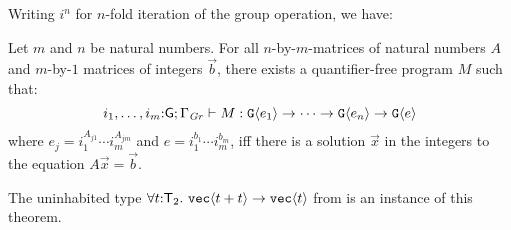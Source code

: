 Writing $i^n$ for $n$-fold iteration of the group operation, we have:
\begin{theorem}
  Let $m$ and $n$ be natural numbers. For all $n$-by-$m$-matrices of
  natural numbers $A$ and $m$-by-$1$ matrices of integers $\vec{b}$,
  there exists a quantifier-free program $M$ such that:
  \begin{displaymath}
    i_1,\dots,i_m\mathord:\mathsf{G}; \Gamma_{\mathit{Gr}} \vdash M : \textup{\texttt{G}}\langle e_1 \rangle \to \dots \to \textup{\texttt{G}}\langle e_n \rangle \to \textup{\texttt{G}}\langle e \rangle
  \end{displaymath}
  where $e_j = i_1^{A_{j1}}\cdots i_m^{A_{jm}}$ and $e = i_1^{b_1}\cdots i_m^{b_m}$, iff there is a solution $\vec{x}$
  in the integers to the equation $A \vec x = \vec{b}$.
\end{theorem}
The uninhabited type $\forall t \mathord: \mathsf{T}_2.\
\textup{\texttt{vec}}\langle t + t \rangle \to \textup{\texttt{vec}}\langle t \rangle$ from
 is an instance of this theorem.  


